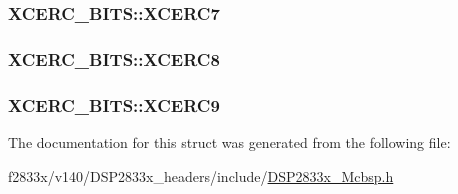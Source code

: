 \subsubsection[{X\+C\+E\+R\+C7}]{ X\+C\+E\+R\+C\+\_\+\+B\+I\+T\+S\+::\+X\+C\+E\+R\+C7}\label{struct_x_c_e_r_c___b_i_t_s_a8e0745723e9d7d02532ffc40dc9f5aa2}
\hypertarget{struct_x_c_e_r_c___b_i_t_s_a11824d0102b44812d96cf138835f0b00}{}
\subsubsection[{X\+C\+E\+R\+C8}]{ X\+C\+E\+R\+C\+\_\+\+B\+I\+T\+S\+::\+X\+C\+E\+R\+C8}\label{struct_x_c_e_r_c___b_i_t_s_a11824d0102b44812d96cf138835f0b00}
\hypertarget{struct_x_c_e_r_c___b_i_t_s_a29ff06c81325b71ae8100408aa4092a8}{}
\subsubsection[{X\+C\+E\+R\+C9}]{ X\+C\+E\+R\+C\+\_\+\+B\+I\+T\+S\+::\+X\+C\+E\+R\+C9}\label{struct_x_c_e_r_c___b_i_t_s_a29ff06c81325b71ae8100408aa4092a8}


The documentation for this struct was generated from the following file\+:\begin{DoxyCompactItemize}
\item 
f2833x/v140/\+D\+S\+P2833x\+\_\+headers/include/\hyperlink{_d_s_p2833x___mcbsp_8h}{D\+S\+P2833x\+\_\+\+Mcbsp.\+h}\end{DoxyCompactItemize}
